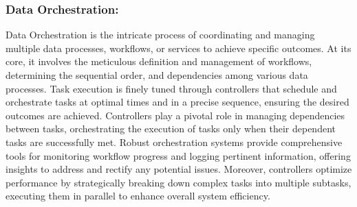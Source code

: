 \subsubsection*{Data Orchestration:}

Data Orchestration is the intricate process of coordinating and managing
multiple data processes, workflows, or services to achieve specific outcomes. At
its core, it involves the meticulous definition and management of workflows,
determining the sequential order, and dependencies among various data processes.
Task execution is finely tuned through controllers that schedule and orchestrate
tasks at optimal times and in a precise sequence, ensuring the desired outcomes
are achieved. Controllers play a pivotal role in managing dependencies between
tasks, orchestrating the execution of tasks only when their dependent tasks are
successfully met. Robust orchestration systems provide comprehensive tools for
monitoring workflow progress and logging pertinent information, offering
insights to address and rectify any potential issues. Moreover, controllers
optimize performance by strategically breaking down complex tasks into multiple
subtasks, executing them in parallel to enhance overall system efficiency.